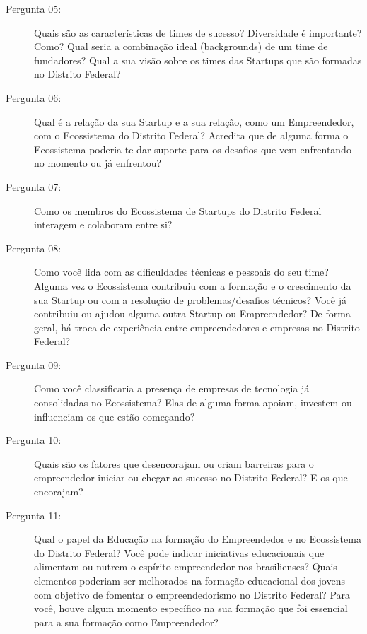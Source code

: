 \begin{apendicesenv}
\begin{description}
  \item [Pergunta 05:] Quais são as características de times de sucesso? Diversidade é importante? Como? Qual seria a combinação ideal (backgrounds) de um time de fundadores? Qual a sua visão sobre os times das Startups que são formadas no Distrito Federal?


  \item [Pergunta 06:] Qual é a relação da sua Startup e a sua relação, como um Empreendedor, com o Ecossistema do Distrito Federal? Acredita que de alguma forma o Ecossistema poderia te dar suporte para os desafios que vem enfrentando no momento ou já enfrentou?

  \item [Pergunta 07:] Como os membros do Ecossistema de Startups do Distrito Federal interagem e colaboram entre si?

  \item [Pergunta 08:] Como você lida com as dificuldades técnicas e pessoais do seu time? Alguma vez o Ecossistema contribuiu com a formação e o crescimento da sua Startup ou com a resolução de problemas/desafios técnicos? Você já contribuiu ou ajudou alguma outra Startup ou Empreendedor? De forma geral, há troca de experiência entre empreendedores e empresas no Distrito Federal? 

  \item [Pergunta 09:] Como você classificaria a presença de empresas de tecnologia já consolidadas no Ecossistema? Elas de alguma forma apoiam, investem ou influenciam os que estão começando?  

  \item [Pergunta 10:] Quais são os fatores que desencorajam ou criam barreiras para o empreendedor iniciar ou chegar ao sucesso no Distrito Federal? E os que encorajam?


  \item [Pergunta 11:] Qual o papel da Educação na formação do Empreendedor e no Ecossistema do Distrito Federal? Você pode indicar iniciativas educacionais que alimentam ou nutrem o espírito empreendedor nos brasilienses? Quais elementos poderiam ser melhorados na formação educacional dos jovens com objetivo de fomentar o empreendedorismo no Distrito Federal? Para você, houve algum momento específico na sua formação que foi essencial para a sua formação como Empreendedor?


\end{description}
\end{apendicesenv}
